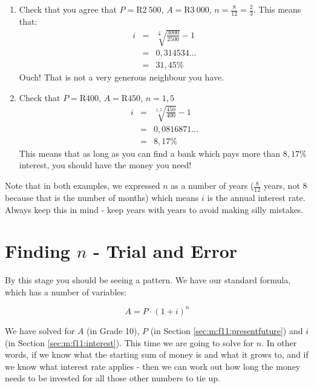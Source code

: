 \begin{enumerate}
\item{Check that you agree that $P=$R$2~500$, $A=$R$3~000$, $n= \frac{8}{12}=\frac{2}{3}$. This means that:
\begin{eqnarray*}
i &=& \sqrt[\frac{2}{3}]{\frac{3000}{2500}} - 1\\
&=& 0,314534...\\
&=& 31,45\%
\end{eqnarray*}
Ouch! That is not a very generous neighbour you have.}

\item{Check that $P=$R$400$, $A=$R$450$, $n=1,5$
\begin{eqnarray*}
i &=& \sqrt[1,5]{\frac{450}{400}} - 1\\
&=& 0,0816871...\\
&=& 8,17\%
\end{eqnarray*}
This means that as long as you can find a bank which pays more than $8,17\%$ interest, you should have the money you need!}
\end{enumerate}

Note that in both examples, we expressed $n$ as a number of years ($\frac{8}{12}$ years, not $8$ because that is the number of months) which means $i$ is the annual interest rate. Always keep this in mind - keep years with years to avoid making silly mistakes.


\section{Finding $n$ - Trial and Error}
\label{sec:m:f11:term}
By this stage you should be seeing a pattern. We have our standard formula, which has a number of variables:

\begin{equation*}
A = P \cdot (1+i)^n
\end{equation*}

We have solved for $A$ (in Grade 10), $P$ (in Section \ref{sec:m:f11:presentfuture}) and $i$ (in Section \ref{sec:m:f11:interest}). This time we are going to solve for $n$. In other words, if we know what the starting sum of money is and what it grows to, and if we know what interest rate applies - then we can work out how long the money needs to be invested for all those other numbers to tie up.

